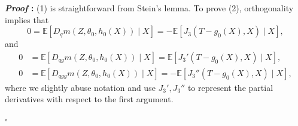 \documentclass{article}
\newcommand{\E}{\mathbb{E}}
\renewenvironment{proof}{\noindent\textbf{\textit{Proof }:}}{\hfill$\square$}
\begin{document}
\begin{proof}
(1) is straightforward from Stein's lemma.
To prove (2), orthogonality implies that
\begin{equation}
    \label{eq:ortho-wrt-q}
    0 = \E \left[ D_q m(Z,\theta_0,h_0(X)) \mid X\right] = - \E\left[J_3(T-g_0(X), X)\mid X\right],
\end{equation}
and
\begin{subequations}
    \label{eq:ortho-wrt-g}
    \begin{align}
        0 &= \E \left[ D_{qg} m(Z,\theta_0,h_0(X)) \mid X\right] = \E\left[ J_3'(T-g_0(X), X) \mid X \right], \label{eq:ortho-wrt-g-1} \\
        0 &= \E \left[ D_{qgg} m(Z,\theta_0,h_0(X)) \mid X\right] = -\E\left[ J_3''(T-g_0(X), X) \mid X \right], \label{eq:ortho-wrt-g-2}
    \end{align}
\end{subequations}
where we slightly abuse notation and use $J_3', J_3''$ to represent the partial derivatives with respect to the first argument.


\end{proof}
\end{document}
